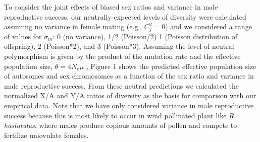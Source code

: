 \documentclass[9pt,twocolumn,twoside]{gsajnl}
\begin{document}
To consider the joint effects of biased sex ratios and variance in male reproductive success, our neutrally-expected levels of diversity were calculated assuming no variance in female mating (e.g., $C^2_{f}=0$) and we considered a range of values for $\sigma_{m}$: 0 (no variance), 1/2 (Poisson/2) 1 (Poisson distribution of offspring), 2 (Poisson*2), and 3 (Poisson*3). Assuming the level of neutral polymorphism is given by the product of the mutation rate and the effective population size, $\theta=4N_{e}\mu$ \citep{watterson1975,kimura1984}, Figure 1 shows the predicted effective population size of autosomes and sex chromosomes as a function of the sex ratio and variance in male reproductive success. From these neutral predictions we calculated the normalized X/A and Y/A ratios of diversity as the basis for comparison with our empirical data.   Note that we have only considered variance in male reproductive success because this is most likely to occur in wind pollinated plant like \textit{R. hastatulus}, where males produce copious amounts of pollen and compete to fertilize uniovulate females.










\end{document}
